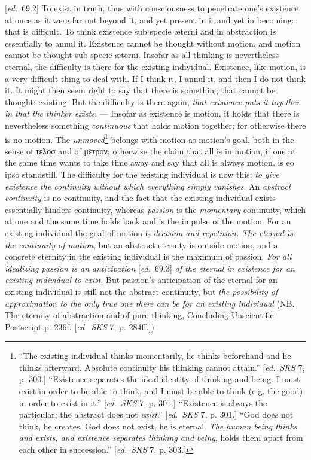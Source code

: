 \documentclass[12pt,a4paper,openany]{book}
\newcommand{\kpage}[1]{\marginnote{\footnotesize\textit{[#1]}}}
\newcommand{\ed}[1]{{\small[\textit{ed.}\ #1]}}
\begin{document}
\ed{69.2} To exist in truth, thus with consciousness to penetrate
one's existence, at once as it were far out beyond it,
and yet present in it and yet in becoming: that is difficult. To
think existence sub specie æterni and in abstraction is essentially
to annul it. Existence cannot be thought without motion,
and motion cannot be thought sub specie æterni. Insofar as all
thinking is nevertheless eternal, the difficulty is there for the existing individual.
Existence, like motion, is a very difficult thing to deal with.
If I think it, I annul it, and then I do not think it. It
might then seem right to say that there is something that cannot be
thought: existing. But the difficulty is there again, \emph{that existence
puts it together in that the thinker exists}. --- Insofar as existence
is motion, it holds that there is nevertheless something \emph{continuous} that
holds motion together; for otherwise there is no motion.
The \emph{unmoved}\footnote[45]{``The existing individual thinks momentarily, he thinks beforehand and he thinks afterward.
Absolute continuity his thinking cannot attain.'' \ed{\emph{SKS} 7, p. 300.} ``Existence
separates the ideal identity of thinking and being. I must exist in order to
be able to think, and I must be able to think (e.g. the good) in order to exist in it.'' \ed{\emph{SKS} 7,
p. 301.} ``Existence is always the particular; the abstract does not \emph{exist}.'' \ed{\emph{SKS} 7,
p. 301.} ``God does not think, he creates. God does not exist, he is eternal. \emph{The human being thinks
and exists, and existence separates thinking and being}, holds them apart from each other in succession.''
\ed{\emph{SKS} 7, p. 303.}}
belongs with motion as motion's
\kpage{122}goal, both in the sense of τελοσ and of μετρον; otherwise the claim that all is in
motion, if one at the same time wants to take time away and say that all is
always motion, is eo ipso standstill. The difficulty for the existing individual
is now this: \emph{to give existence the continuity without which everything simply
vanishes}. An \emph{abstract continuity} is no continuity, and the fact
that the existing individual exists essentially hinders continuity,
whereas \emph{passion} is the \emph{momentary} continuity, which
at one and the same time holds back and is the impulse of the motion. For an existing individual
the goal of motion is \emph{decision and repetition. The eternal is the continuity
of motion}, but an abstract eternity is outside motion,
and a concrete eternity in the existing individual is the maximum of
passion. \emph{For all idealizing passion is an anticipation} \ed{69.3} \emph{of the
eternal in existence for an existing individual to exist}. But passion's anticipation
of the eternal for an existing individual is still not the abstract
continuity, but \emph{the possibility of approximation to the only true one there
can be for an existing individual} (NB. The eternity of abstraction and of pure thinking,
Concluding Unscientific Postscript p. 236f.
\ed{\emph{SKS} 7, p. 284ff.})
\end{document}
